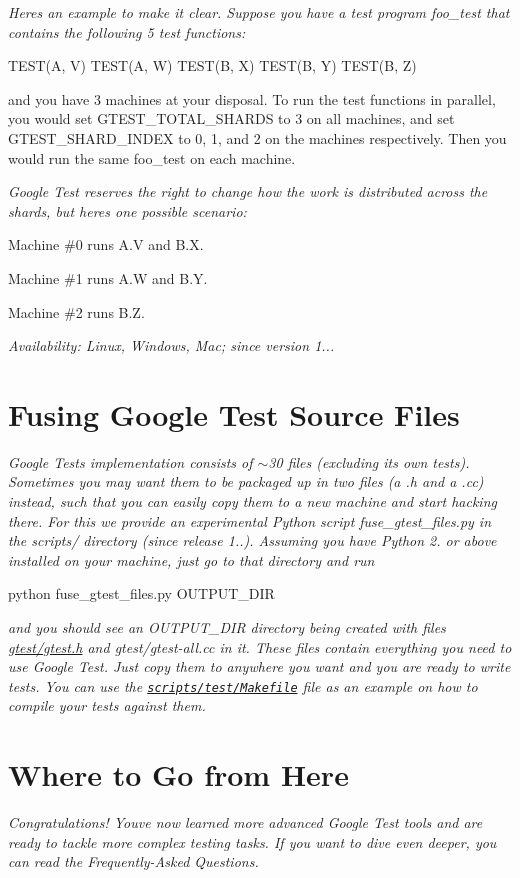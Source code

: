 {\itshape Here\textquotesingle{}s an example to make it clear. Suppose you have a test program {\ttfamily foo\+\_\+test} that contains the following 5 test functions\+: 
\begin{DoxyCode}
TEST(A, V)
TEST(A, W)
TEST(B, X)
TEST(B, Y)
TEST(B, Z)
\end{DoxyCode}
 and you have 3 machines at your disposal. To run the test functions in parallel, you would set {\ttfamily G\+T\+E\+S\+T\+\_\+\+T\+O\+T\+A\+L\+\_\+\+S\+H\+A\+R\+DS} to 3 on all machines, and set {\ttfamily G\+T\+E\+S\+T\+\_\+\+S\+H\+A\+R\+D\+\_\+\+I\+N\+D\+EX} to 0, 1, and 2 on the machines respectively. Then you would run the same {\ttfamily foo\+\_\+test} on each machine.}

{\itshape Google Test reserves the right to change how the work is distributed across the shards, but here\textquotesingle{}s one possible scenario\+:}

{\itshape 
\begin{DoxyItemize}
\item Machine \#0 runs {\ttfamily A.\+V} and {\ttfamily B.\+X}.
\item Machine \#1 runs {\ttfamily A.\+W} and {\ttfamily B.\+Y}.
\item Machine \#2 runs {\ttfamily B.\+Z}.
\end{DoxyItemize}}

{\itshape {\itshape Availability\+:} Linux, Windows, Mac; since version 1...}

{\itshape \section*{Fusing Google Test Source Files}}

{\itshape }

{\itshape Google Test\textquotesingle{}s implementation consists of $\sim$30 files (excluding its own tests). Sometimes you may want them to be packaged up in two files (a {\ttfamily .h} and a {\ttfamily .cc}) instead, such that you can easily copy them to a new machine and start hacking there. For this we provide an experimental Python script {\ttfamily fuse\+\_\+gtest\+\_\+files.\+py} in the {\ttfamily scripts/} directory (since release 1..). Assuming you have Python 2. or above installed on your machine, just go to that directory and run 
\begin{DoxyCode}
python fuse\_gtest\_files.py OUTPUT\_DIR
\end{DoxyCode}
}

{\itshape and you should see an {\ttfamily O\+U\+T\+P\+U\+T\+\_\+\+D\+IR} directory being created with files {\ttfamily \mbox{\hyperlink{gtest_8h_source}{gtest/gtest.\+h}}} and {\ttfamily gtest/gtest-\/all.\+cc} in it. These files contain everything you need to use Google Test. Just copy them to anywhere you want and you are ready to write tests. You can use the \href{../scripts/test/Makefile}{\tt scripts/test/\+Makefile} file as an example on how to compile your tests against them.}

{\itshape \section*{Where to Go from Here}}

{\itshape }

{\itshape Congratulations! You\textquotesingle{}ve now learned more advanced Google Test tools and are ready to tackle more complex testing tasks. If you want to dive even deeper, you can read the Frequently-\/\+Asked Questions. }